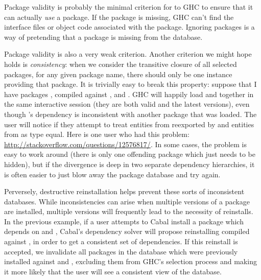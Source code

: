 \documentclass{article}
\begin{document}
Package validity is probably the minimal criterion for to GHC to ensure
that it can actually \emph{use} a package.  If the package is missing,
GHC can't find the interface files or object code associated with the
package.  Ignoring packages is a way of pretending that a package is
missing from the database.

Package validity is also a very weak criterion.  Another criterion we
might hope holds is \emph{consistency}: when we consider the transitive
closure of all selected packages, for any given package name, there
should only be one instance providing that package.  It is trivially
easy to break this property: suppose that I have packages ,
 compiled against , and .  GHC
will happily load  and  together in the same
interactive session (they are both valid and the latest versions), even
though 's dependency is inconsistent with another package
that was loaded.  The user will notice if they attempt to treat entities
from  reexported by  and entities from
 as type equal.  Here is one user who had this problem:
\url{http://stackoverflow.com/questions/12576817/}.  In some cases, the
problem is easy to work around (there is only one offending package
which just needs to be hidden), but if the divergence is deep in two
separate dependency hierarchies, it is often easier to just blow away
the package database and try again.

Perversely, destructive reinstallation helps prevent these sorts of
inconsistent databases.  While inconsistencies can arise when multiple
versions of a package are installed, multiple versions will frequently
lead to the necessity of reinstalls.  In the previous example, if a user
attempts to Cabal install a package which depends on  and
, Cabal's dependency solver will propose reinstalling
 compiled against , in order to get a
consistent set of dependencies.  If this reinstall is accepted, we
invalidate all packages in the database which were previously installed
against  and , excluding them from GHC's
selection process and making it more likely that the user will see a
consistent view of the database.
\end{document}
